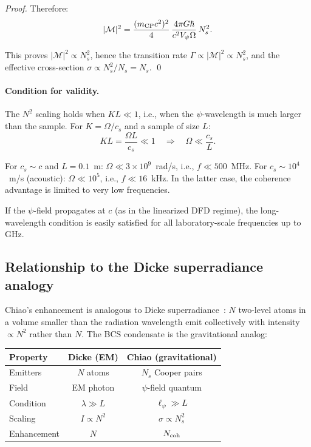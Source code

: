 \documentclass[12pt,aps,prd,twocolumn,superscriptaddress,nofootinbib]{revtex4-2}
\newcommand{\ee}[1]{\times 10^{#1}}
\begin{document}
\begin{proof}
Therefore:
\begin{equation}\label{eq:M-squared}
|\mathcal{M}|^2 = \frac{(m_{\rm CP}c^2)^2}{4}\,
\frac{4\pi G\hbar}{c^2 V_\psi\Omega}\,N_s^2.
\end{equation}

This proves $|\mathcal{M}|^2 \propto N_s^2$, hence the transition
rate $\Gamma \propto |\mathcal{M}|^2 \propto N_s^2$, and the
effective cross-section $\sigma \propto N_s^2/N_s = N_s$.
\qed
\end{proof}

\paragraph{Condition for validity.} The $N^2$ scaling holds when
$KL \ll 1$, i.e., when the $\psi$-wavelength is much larger than
the sample. For $K = \Omega/c_s$ and a sample of size $L$:
\begin{equation}\label{eq:long-wavelength}
KL = \frac{\Omega L}{c_s} \ll 1
\quad\Rightarrow\quad
\Omega \ll \frac{c_s}{L}.
\end{equation}

For $c_s \sim c$ and $L = 0.1$~m: $\Omega \ll 3\ee{9}$~rad/s, i.e.,
$f \ll 500$~MHz. For $c_s \sim 10^4$~m/s (acoustic): $\Omega \ll 10^5$,
i.e., $f \ll 16$~kHz. In the latter case, the coherence advantage is
limited to very low frequencies.

If the $\psi$-field propagates at $c$ (as in the linearized DFD regime),
the long-wavelength condition is easily satisfied for all laboratory-scale
frequencies up to GHz.

\subsection{Relationship to the Dicke superradiance analogy}
\label{sec:dicke}

Chiao's enhancement is analogous to Dicke superradiance~\cite{Dicke1954}:
$N$ two-level atoms in a volume smaller than the radiation wavelength
emit collectively with intensity $\propto N^2$ rather than $N$. The
BCS condensate is the gravitational analog:

\begin{center}
\begin{tabular}{lcc}
\toprule
Property & Dicke (EM) & Chiao (gravitational) \\
\midrule
Emitters & $N$ atoms & $N_s$ Cooper pairs \\
Field & EM photon & $\psi$-field quantum \\
Condition & $\lambda \gg L$ & $\ell_\psi \gg L$ \\
Scaling & $I \propto N^2$ & $\sigma \propto N_s^2$ \\
Enhancement & $N$ & $N_{\rm coh}$ \\
\bottomrule
\end{tabular}
\end{center}
\end{document}

